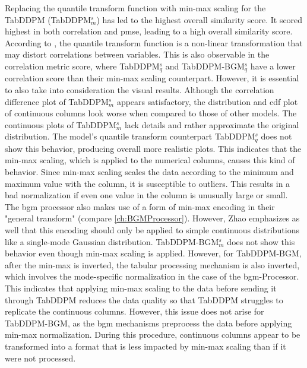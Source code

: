 Replacing the quantile transform function with min-max scaling for the TabDDPM (TabDDPM$^{s}_m$) has led to the highest overall similarity score.
It scored highest in both correlation and \gls{pmse}, leading to a high overall similarity score.
According to \cite{scikit-learndevelopers2023QuantileTransformer}, the quantile transform function is a non-linear transformation that may distort correlations between variables.
This is also observable in the correlation metric score, where TabDDPM$^{s}_q$ and TabDDPM-BGM$^{s}_q$ have a lower correlation score than their min-max scaling counterpart.
However, it is essential to also take into consideration the visual results.
Although the correlation difference plot of TabDDPM$^{s}_m$ appears satisfactory, the distribution and \gls{cdf} plot of continuous columns look worse when compared to those of other models.
The continuous plots of TabDDPM$^{s}_m$ lack details and rather approximate the original distribution.
The model's quantile transform counterpart TabDDPM$^{s}_q$ does not show this behavior, producing overall more realistic plots.
This indicates that the min-max scaling, which is applied to the numerical columns, causes this kind of behavior.
Since min-max scaling scales the data according to the minimum and maximum value with the column, it is susceptible to outliers.
This results in a bad normalization if even one value in the column is unusually large or small.
The \gls{bgm} processor also makes use of a form of min-max encoding in their "general transform" \cite[p. 7]{zhao2022CTABGANEnhancingTabular} (compare \autoref{ch:BGMProcessor}).
However, Zhao \etal \cite{zhao2022CTABGANEnhancingTabular} emphasizes as well that this encoding should only be applied to simple continuous distributions like a single-mode Gaussian distribution.
TabDDPM-BGM$^{s}_m$ does not show this behavior even though min-max scaling is applied.
However, for TabDDPM-BGM, after the min-max is inverted, the tabular processing mechanism is also inverted, which involves the mode-specific normalization in the case of the \gls{bgm}-Processor.
This indicates that applying min-max scaling to the data before sending it through TabDDPM reduces the data quality so that TabDDPM struggles to replicate the continuous columns.
However, this issue does not arise for TabDDPM-BGM, as the \gls{bgm} mechanisms preprocess the data before applying min-max normalization.
During this procedure, continuous columns appear to be transformed into a format that is less impacted by min-max scaling than if it were not processed.

